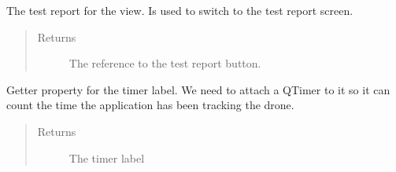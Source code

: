 \documentclass[letterpaper,10pt,english]{sphinxmanual}
\begin{document}
\begin{fulllineitems}
\begin{fulllineitems}
\begin{quote}
\begin{description}
\end{description}\end{quote}

\end{fulllineitems}


\begin{fulllineitems}
\label{\detokenize{index:src.Views.View_LoadingScreen.LoadingWindow.del_BtnTestReport}}
The test report for the view. Is used to switch to the test report screen.
\begin{quote}\begin{description}
\item[{Returns}] \leavevmode
The reference to the test report button.

\end{description}\end{quote}

\end{fulllineitems}


\begin{fulllineitems}
\label{\detokenize{index:src.Views.View_LoadingScreen.LoadingWindow.del_LblStatus}}
Getter property for the timer label. We need to attach a QTimer to it so it can count the time the
application has been tracking the drone.
\begin{quote}\begin{description}
\item[{Returns}] \leavevmode
The timer label

\end{description}\end{quote}

\end{fulllineitems}



\end{fulllineitems}
\end{document}
